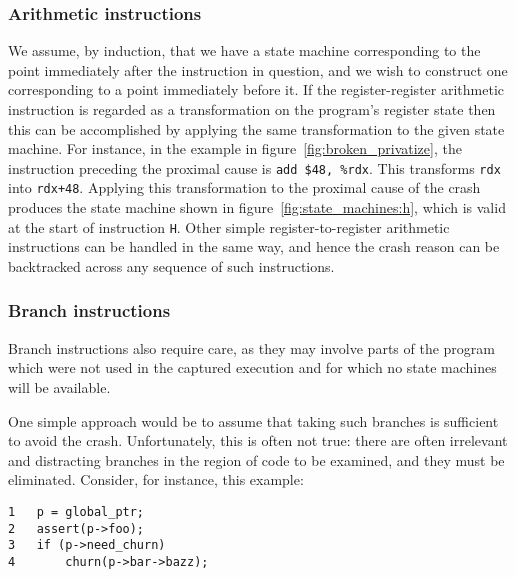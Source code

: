 \documentclass[10pt,twocolumn,preprint,natbib,authoryear]{sigplanconf}
\newcommand{\editorial}[1]{}
\begin{document}
\subsubsection{Arithmetic instructions}

We assume, by induction, that we have a state machine corresponding to
the point immediately after the instruction in question, and we wish
to construct one corresponding to a point immediately before it.  If
the register-register arithmetic instruction is regarded as a
transformation on the program's register state then this can be
accomplished by applying the same transformation to the given state
machine.  For instance, in the example in
figure~\ref{fig:broken_privatize}, the instruction preceding the
proximal cause is \verb|add $48, %rdx|.  This transforms \verb|rdx|
into \verb|rdx+48|.  Applying this transformation to the proximal
cause of the crash produces the state machine shown in
figure~\ref{fig:state_machines:h}, which is valid at the start of
instruction \verb|H|.  Other simple register-to-register arithmetic
instructions can be handled in the same way, and hence the crash
reason can be backtracked across any sequence of such
instructions.\editorial{The reason this works is something to do with
  the underlying category of state machines being linear with respect
  to register-register instructions expressed as homomorphisms, but a)
  that's not really the kind of thing you say in a systems paper, and
  b) I don't understand it well enough to explain it correctly,
  anyway.}

\editorial{Our implementation uses libVEX to decode x86 instructions
  into a sequence of micro-operations which can be used as input to
  this process.} 

\subsubsection{Branch instructions}
\label{sect:branch_instrs}
Branch instructions also require care, as they may involve parts of
the program which were not used in the captured execution and for
which no state machines will be available.\editorial{SSP}

One simple approach would be to assume that taking such branches is
sufficient to avoid the crash.  Unfortunately, this is often not true:
there are often irrelevant and distracting branches in the region of
code to be examined, and they must be eliminated.  Consider, for
instance, this example:

\begin{verbatim}
1   p = global_ptr;
2   assert(p->foo);
3   if (p->need_churn)
4       churn(p->bar->bazz);
\end{verbatim}
\end{document}
